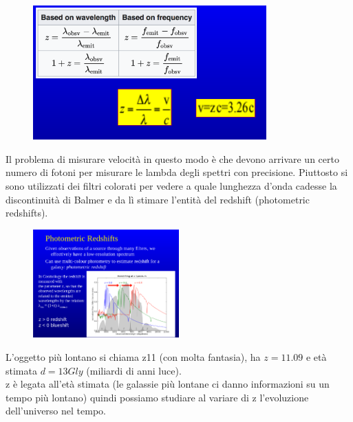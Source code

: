 \documentclass[a4paper,11pt]{article}
\begin{document}
\begin{figure}[h!!]
        \centering
        \includegraphics[width=0.8\textwidth]{immagini16dic/parametroz.png}
        \label{}
    \end{figure}
 \newpage
Il problema di misurare velocità in questo modo è che devono arrivare un certo numero di fotoni per misurare le lambda degli spettri con precisione.
Piuttosto si sono utilizzati dei filtri colorati per vedere a quale lunghezza d'onda cadesse la discontinuità di Balmer e da lì stimare l'entità del redshift (photometric redshifts).
\begin{figure}[h!!]
        \centering
        \includegraphics[width=0.5\textwidth]{immagini16dic/photoredshift.png}
        \label{}
    \end{figure}
 \newline
L'oggetto più lontano si chiama z11 (con molta fantasia), ha $z=11.09$ e età stimata $d=13 Gly$ (miliardi di anni luce). \\
z è legata all'età stimata (le galassie più lontane ci danno informazioni su un tempo più lontano) quindi possiamo studiare al variare di z l'evoluzione dell'universo nel tempo. \\
\end{document}
